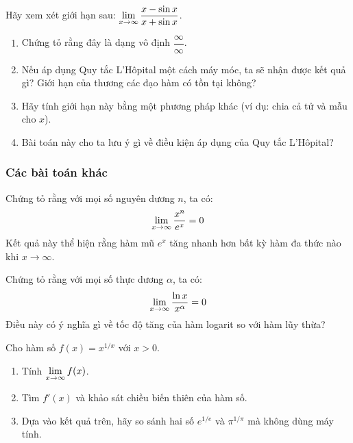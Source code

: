 \begin{exercise}
Hãy xem xét giới hạn sau: $\lim\limits_{x \to \infty} \dfrac{x - \sin x}{x + \sin x}$.
\begin{enumerate}[label=(\alph*)]
    \item Chứng tỏ rằng đây là dạng vô định $\dfrac{\infty}{\infty}$.
    \item Nếu áp dụng Quy tắc L'Hôpital một cách máy móc, ta sẽ nhận được kết quả gì? Giới hạn của thương các đạo hàm có tồn tại không?
    \item Hãy tính giới hạn này bằng một phương pháp khác (ví dụ: chia cả tử và mẫu cho $x$).
    \item Bài toán này cho ta lưu ý gì về điều kiện áp dụng của Quy tắc L'Hôpital?
\end{enumerate}
\end{exercise}

\subsubsection{Các bài toán khác}

\begin{exercise}
Chứng tỏ rằng với mọi số nguyên dương $n$, ta có:
$$ \lim\limits_{x \to \infty} \dfrac{x^n}{e^x} = 0 $$
Kết quả này thể hiện rằng hàm mũ $e^x$ tăng nhanh hơn bất kỳ hàm đa thức nào khi $x \to \infty$.
\end{exercise}

\begin{exercise}
Chứng tỏ rằng với mọi số thực dương $\alpha$, ta có:
$$ \lim\limits_{x \to \infty} \dfrac{\ln x}{x^\alpha} = 0 $$
Điều này có ý nghĩa gì về tốc độ tăng của hàm logarit so với hàm lũy thừa?
\end{exercise}

\begin{exercise}
Cho hàm số $f(x) = x^{1/x}$ với $x > 0$.
\begin{enumerate}[label=(\alph*)]
    \item Tính $\lim\limits_{x \to \infty} f(x)$.
    \item Tìm $f'(x)$ và khảo sát chiều biến thiên của hàm số.
    \item Dựa vào kết quả trên, hãy so sánh hai số $e^{1/e}$ và $\pi^{1/\pi}$ mà không dùng máy tính.
\end{enumerate}
\end{exercise}

